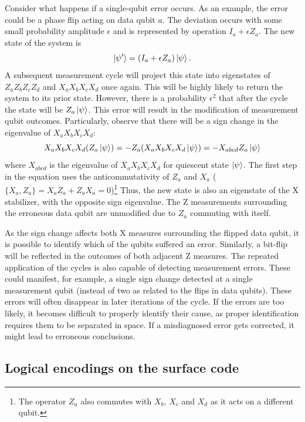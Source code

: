 Consider what happens if a single-qubit error occurs. As an example, the error could be a phase flip acting on data qubit $a$. The deviation occurs with some small probability amplitude $\epsilon$ and is represented by operation $I_a+\epsilon Z_a$. The new state of the system is
\begin{equation}
    \ket{\psi'}=(I_a+\epsilon Z_a)\ket{\psi}.
\end{equation}
A subsequent measurement cycle will project this state into eigenstates of $Z_aZ_bZ_cZ_d$ and $X_aX_bX_cX_d$ once again. This will be highly likely to return the system to its prior state. However, there is a probability $\epsilon^2$ that after the cycle the state will be $Z_a\ket{\psi}$. This error will result in the modification of measurement qubit outcomes. Particularly, observe that there will be a sign change in the eigenvalue of $X_aX_bX_cX_d$:
\begin{equation}
    X_aX_bX_cX_d(Z_a\ket{\psi})=-Z_a(X_aX_bX_cX_d\ket{\psi})=-X_{abcd} Z_a\ket{\psi}
\end{equation}
where $X_{abcd}$ is the eigenvalue of $X_aX_bX_cX_d$ for quiescent state $\ket{\psi}$. The first step in the equation uses the anticommutativity of $Z_a$ and $X_a$ ($\{X_a,Z_a\}=X_aZ_a+Z_aX_a=0$)\footnote{The operator $Z_a$ also commutes with $X_b$, $X_c$ and $X_d$ as it acts on a different qubit.} Thus, the new state is also an eigenstate of the X stabilizer, with the opposite sign eigenvalue. The Z measurements surrounding the erroneous data qubit are unmodified due to $Z_a$ commuting with itself.

As the sign change affects both X measures surrounding the flipped data qubit, it is possible to identify which of the qubits suffered an error. Similarly, a bit-flip will be reflected in the outcomes of both adjacent Z measures. The repeated application of the cycles is also capable of detecting measurement errors. These could manifest, for example, a single sign change detected at a single measurement qubit (instead of two as related to the flips in data qubits). These errors will often disappear in later iterations of the cycle. If the errors are too likely, it becomes difficult to properly identify their cause, as proper identification requires them to be separated in space. If a misdiagnosed error gets corrected, it might lead to erroneous conclusions\cite{Fowler2012}.

\subsection{Logical encodings on the surface code}

